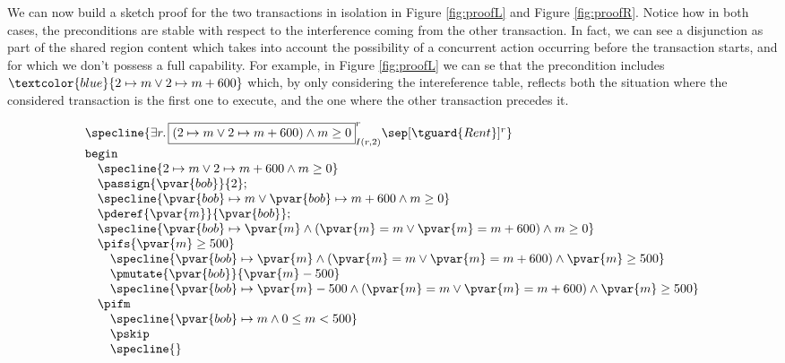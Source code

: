 We can now build a sketch proof for the two transactions in isolation in Figure \ref{fig:proofL} and Figure \ref{fig:proofR}. Notice how in both cases, the preconditions are stable with respect to the interference coming from the other transaction. In fact, we can see a disjunction as part of the shared region content which takes into account the possibility of a concurrent action occurring before the transaction starts, and for which we don't possess a full capability. For example, in Figure \ref{fig:proofL} we can se that the precondition includes $\textcolor{blue}{2 \mapsto m \lor 2 \mapsto m + 600}$ which, by only considering the intereference table, reflects both the situation where the considered transaction is the first one to execute, and the one where the other transaction precedes it.
\begin{center}
\[
	\begin{array}{l}
		\specline{
				\exists r \ldotp
					\boxed{
						\left( 2 \mapsto m \lor 2 \mapsto m + 600 \right) \land m \geq 0
					}^r_{I(r, 2)}
					\sep [\tguard{Rent}]^r
		} \\
		\mathtt{begin} \\
			\quad \specline{2 \mapsto m \lor 2 \mapsto m + 600 \land m \geq 0} \\
			\quad \passign{\pvar{bob}}{2}; \\
			\quad \specline{
				\pvar{bob} \mapsto m \lor \pvar{bob} \mapsto m + 600 \land m \geq 0
			} \\
			\quad \pderef{\pvar{m}}{\pvar{bob}}; \\
			\quad \specline{
				\pvar{bob} \mapsto \pvar{m} \land \left(\pvar{m} = m \lor \pvar{m} = m + 600\right) \land m \geq 0
			} \\
			\quad \pifs{\pvar{m} \geq 500} \\
				\quad \quad \specline{
					\pvar{bob} \mapsto \pvar{m} \land \left(\pvar{m} = m \lor \pvar{m} = m + 600\right) \land \pvar{m} \geq 500
				} \\
				\quad \quad \pmutate{\pvar{bob}}{\pvar{m} - 500} \\
				\quad \quad \specline{
					\pvar{bob} \mapsto \pvar{m} - 500 \land \left(\pvar{m} = m \lor \pvar{m} = m + 600\right) \land \pvar{m} \geq 500
				} \\
			\quad \pifm \\
				\quad \quad \specline{
					\pvar{bob} \mapsto m \land 0 \leq m < 500
				} \\
				\quad \quad \pskip \\
				\quad \quad \specline{
}
\end{array}\]
\end{center}
